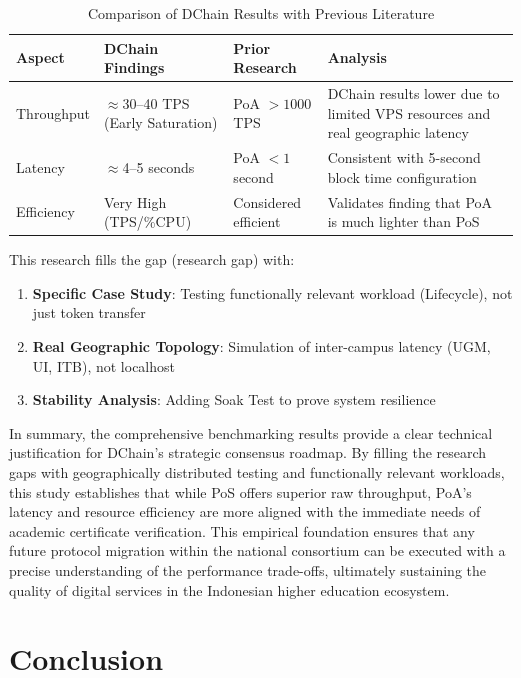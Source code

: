 \documentclass[conference]{IEEEtran}
\begin{document}
\begin{table}[htbp]
\centering
\caption{Comparison of DChain Results with Previous Literature}
\label{tab:comparison_literature}
\begin{tabular}{|p{1.8cm}|p{2cm}|p{2cm}|p{2cm}|}
\hline
\textbf{Aspect} & \textbf{DChain Findings} & \textbf{Prior Research} & \textbf{Analysis} \\
\hline
Throughput & $\approx$30--40 TPS (Early Saturation) & PoA $>1000$ TPS \cite{choi2020,rebello2020} & DChain results lower due to limited VPS resources and real geographic latency \\
\hline
Latency & $\approx$4--5 seconds & PoA $<1$ second \cite{arslan2020,wicaksono2025} & Consistent with 5-second block time configuration \\
\hline
Efficiency & Very High (TPS/\%CPU) & Considered efficient \cite{sharma2020,ali2020} & Validates finding that PoA is much lighter than PoS \\
\hline
\end{tabular}
\end{table}

This research fills the gap (research gap) with:
\begin{enumerate}
    \item \textbf{Specific Case Study}: Testing functionally relevant workload (Lifecycle), not just token transfer
    \item \textbf{Real Geographic Topology}: Simulation of inter-campus latency (UGM, UI, ITB), not localhost
    \item \textbf{Stability Analysis}: Adding Soak Test to prove system resilience
\end{enumerate}

In summary, the comprehensive benchmarking results provide a clear technical justification for DChain's strategic consensus roadmap. By filling the research gaps with geographically distributed testing and functionally relevant workloads, this study establishes that while PoS offers superior raw throughput, PoA's latency and resource efficiency are more aligned with the immediate needs of academic certificate verification. This empirical foundation ensures that any future protocol migration within the national consortium can be executed with a precise understanding of the performance trade-offs, ultimately sustaining the quality of digital services in the Indonesian higher education ecosystem.

\section{Conclusion}
\end{document}
